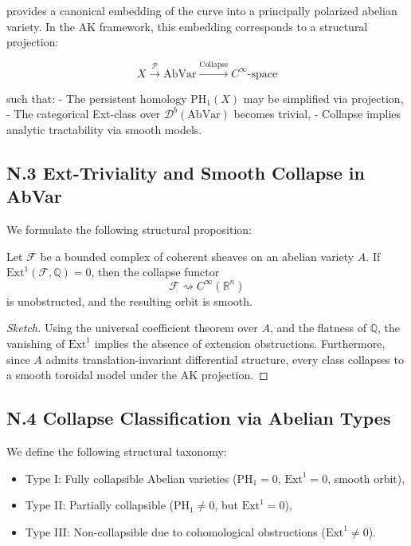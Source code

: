 \documentclass[11pt]{article}
\begin{document}
\begin{axiom}
\begin{axiom}
{{provides a canonical embedding of the curve into a principally polarized abelian variety.  
In the AK framework, this embedding corresponds to a structural projection:

\[
X \xrightarrow{\mathcal{P}} \mathrm{AbVar} \xrightarrow{\text{Collapse}} C^\infty\text{-space}
\]

such that:
- The persistent homology \( \mathrm{PH}_1(X) \) may be simplified via projection,
- The categorical Ext-class over \( \mathcal{D}^b(\mathrm{AbVar}) \) becomes trivial,
- Collapse implies analytic tractability via smooth models.

\subsection*{N.3 Ext-Triviality and Smooth Collapse in AbVar}

We formulate the following structural proposition:

\begin{proposition}
Let \( \mathcal{F} \) be a bounded complex of coherent sheaves on an abelian variety \( A \).  
If \( \mathrm{Ext}^1(\mathcal{F}, \mathbb{Q}) = 0 \), then the collapse functor
\[
\mathcal{F} \rightsquigarrow C^\infty(\mathbb{R}^n)
\]
is unobstructed, and the resulting orbit is smooth.
\end{proposition}

\begin{proof}[Sketch]
Using the universal coefficient theorem over \( A \), and the flatness of \( \mathbb{Q} \), the vanishing of \( \mathrm{Ext}^1 \) implies the absence of extension obstructions.  
Furthermore, since \( A \) admits translation-invariant differential structure, every class collapses to a smooth toroidal model under the AK projection.
\end{proof}

\subsection*{N.4 Collapse Classification via Abelian Types}

We define the following structural taxonomy:

\begin{itemize}
  \item Type I: Fully collapsible Abelian varieties (\( \mathrm{PH}_1 = 0 \), \( \mathrm{Ext}^1 = 0 \), smooth orbit),
  \item Type II: Partially collapsible (\( \mathrm{PH}_1 \neq 0 \), but \( \mathrm{Ext}^1 = 0 \)),
  \item Type III: Non-collapsible due to cohomological obstructions (\( \mathrm{Ext}^1 \neq 0 \)).
\end{itemize}

}}
\end{axiom}
\end{axiom}
\end{document}
